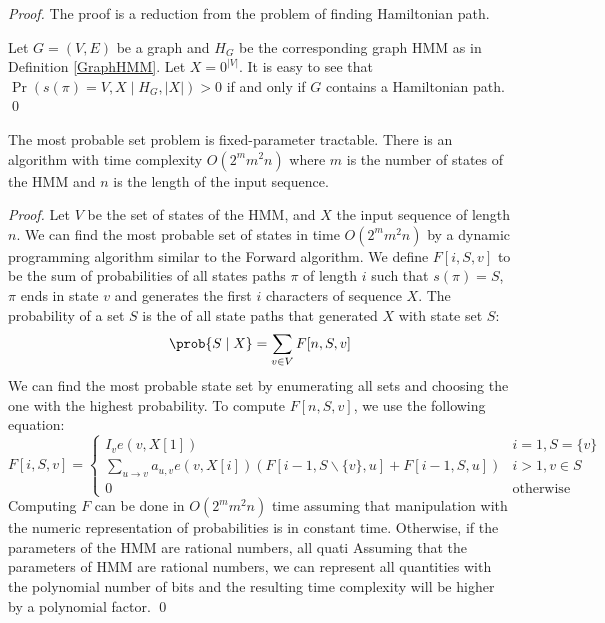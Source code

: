 \begin{proof} The proof is a reduction from the problem of finding Hamiltonian path.


Let $G=(V,E)$ be a graph  
and $H_G$ be the corresponding graph HMM as
in Definition \ref{GraphHMM}. Let $X=0^{|V|}$.  
It is easy to see that $\Pr\left(s(\pi)=V,X \mid H_G, |X|
\right)>0$ if and only if $G$ contains a Hamiltonian path. \qed
\end{proof}

\begin{theorem} \label{THEOREM::SETFIXEDTRACT}
The most probable set problem is fixed-parameter tractable. There is an
algorithm with time complexity $O(2^mm^2n)$ where $m$ is the number of states
of the HMM and $n$ is the length of the input sequence. 
\end{theorem}

\begin{proof}
Let $V$ be the set of states of the HMM, and $X$ the input sequence of length
$n$.  We can find the most probable set of states in time $O(2^m m^2 n)$ by a
dynamic programming algorithm similar to the Forward algorithm.  We define
$F[i,S,v]$ to be the sum of probabilities of all states paths $\pi$ of length
$i$ such that $s(\pi)=S$, $\pi$ ends in state $v$ and generates the first $i$
characters of sequence $X$.  The probability of a set $S$ is the of all state
paths that generated $X$ with state set $S$:
\begin{equation}
\prob{S\mid X} = \sum_{v\in V} F[n, S, v]
\end{equation}
We can find the most probable state set by enumerating all sets and choosing
the one with the highest probability.  To compute $F[n,S,v]$, we use the
following equation:
\begin{equation}
F[i,S,v] = \begin{cases}
I_{v}e(v,X[1])& i=1,S=\{v\}\\ 
\displaystyle \sum_{u\to v}a_{u,v}e(v,X[i])\left(F[i-1,S\backslash\{v\},u]
+ F[i-1,S,u]\right) & i>1, v\in S\\
0 & \mbox{otherwise}
\end{cases}
\end{equation}
Computing $F$ can be done in $O(2^mm^2n)$ time assuming that manipulation with
the numeric representation of probabilities is in constant time. Otherwise, if
the parameters of the HMM are rational numbers, all quati Assuming that the
parameters of HMM are rational numbers, we can represent all quantities with
the polynomial number of bits and the resulting time complexity will be higher
by a polynomial factor.
\qed
\end{proof}

